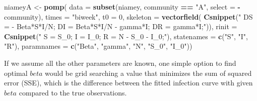 \documentclass[]{book}
\newenvironment{Shaded}{\begin{snugshade}}{\end{snugshade}}
\newcommand{\KeywordTok}[1]{\textcolor[rgb]{0.13,0.29,0.53}{\textbf{#1}}}
\newcommand{\DataTypeTok}[1]{\textcolor[rgb]{0.13,0.29,0.53}{#1}}
\newcommand{\DecValTok}[1]{\textcolor[rgb]{0.00,0.00,0.81}{#1}}
\newcommand{\StringTok}[1]{\textcolor[rgb]{0.31,0.60,0.02}{#1}}
\newcommand{\OperatorTok}[1]{\textcolor[rgb]{0.81,0.36,0.00}{\textbf{#1}}}
\newcommand{\NormalTok}[1]{#1}
\begin{document}
\begin{Shaded}
\begin{Highlighting}[]
\NormalTok{niameyA <-}\StringTok{ }\KeywordTok{pomp}\NormalTok{(}
  \DataTypeTok{data =} \KeywordTok{subset}\NormalTok{(niamey, community }\OperatorTok{==}\StringTok{ "A"}\NormalTok{, }\DataTypeTok{select =} \OperatorTok{-}\StringTok{ }\NormalTok{community), }
  \DataTypeTok{times =} \StringTok{"biweek"}\NormalTok{, }\DataTypeTok{t0 =} \DecValTok{0}\NormalTok{, }
  \DataTypeTok{skeleton =} \KeywordTok{vectorfield}\NormalTok{(}
    \KeywordTok{Csnippet}\NormalTok{(}\StringTok{"}
\StringTok{      DS = - Beta*S*I/N;}
\StringTok{      DI = Beta*S*I/N - gamma*I;}
\StringTok{      DR = gamma*I;"}\NormalTok{)), }
  \DataTypeTok{rinit =} \KeywordTok{Csnippet}\NormalTok{(}\StringTok{"}
\StringTok{      S = S_0;}
\StringTok{      I = I_0;}
\StringTok{      R = N - S_0 - I_0;"}\NormalTok{), }
  \DataTypeTok{statenames =} \KeywordTok{c}\NormalTok{(}\StringTok{"S"}\NormalTok{, }\StringTok{"I"}\NormalTok{, }\StringTok{"R"}\NormalTok{), }
  \DataTypeTok{paramnames =} \KeywordTok{c}\NormalTok{(}\StringTok{"Beta"}\NormalTok{, }\StringTok{"gamma"}\NormalTok{, }\StringTok{"N"}\NormalTok{, }\StringTok{"S_0"}\NormalTok{, }\StringTok{"I_0"}\NormalTok{))}
\end{Highlighting}
\end{Shaded}

If we assume all the other parameters are known, one simple option to
find optimal \(beta\) would be grid searching a value that minimizes the
sum of squared error (SSE), which is the difference between the fitted
infection curve with given \(beta\) compared to the true observations.
\end{document}
